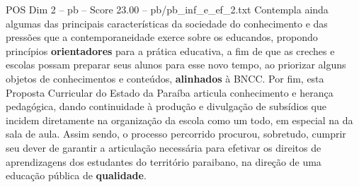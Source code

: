 \begin{textsample}{POS Dim 2 – pb – Score 23.00 – pb/pb\_inf\_e\_ef\_2.txt}
Contempla ainda algumas das principais características da sociedade do conhecimento e das pressões que a contemporaneidade exerce sobre os educandos, propondo princípios \textbf{orientadores} para a prática educativa, a fim de que as creches e escolas possam preparar seus alunos para esse novo tempo, ao priorizar alguns objetos de conhecimentos e conteúdos, \textbf{alinhados} à BNCC.
Por fim, esta Proposta Curricular do Estado da Paraíba articula conhecimento e herança pedagógica, dando continuidade à produção e divulgação de subsídios que incidem diretamente na organização da escola como um todo, em especial na da sala de aula.
Assim sendo, o processo percorrido procurou, sobretudo, cumprir seu dever de garantir a articulação necessária para efetivar os direitos de aprendizagens dos estudantes do território paraibano, na direção de uma educação pública de \textbf{qualidade}.

\end{textsample}
